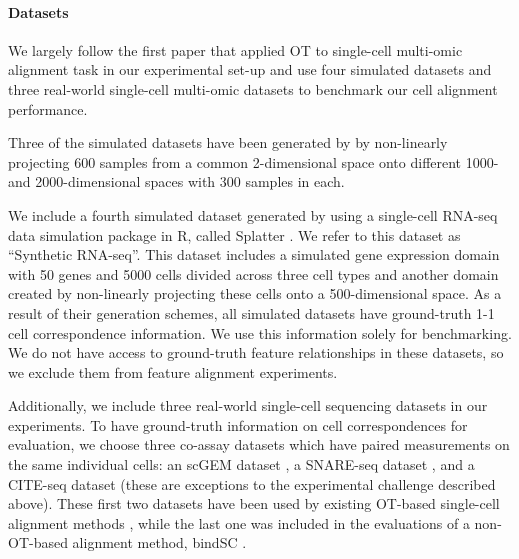 \paragraph{Datasets} We largely follow the first paper that applied OT to
single-cell multi-omic alignment task \citep{Demetci20} in our experimental set-up and
use four simulated datasets and three real-world single-cell multi-omic datasets to benchmark
our cell alignment performance.

Three of the simulated datasets have been generated by
\citep{liu_et_al:LIPIcs:2019:11040} by non-linearly projecting 600 samples from a common
2-dimensional space onto different 1000- and 2000-dimensional spaces with 300 samples in each.

We include a fourth simulated dataset generated by \citep{Demetci20} using a single-cell RNA-seq
data simulation package in R, called Splatter \citep{zappia2017splatter}.
We refer to this dataset as ``Synthetic RNA-seq''. This dataset includes a simulated gene expression
domain with 50 genes and 5000 cells divided across three cell types and another domain created
by non-linearly projecting these cells onto a 500-dimensional space. As a result of
their generation schemes, all simulated datasets have ground-truth 1-1 cell
correspondence information. We use this information solely for benchmarking.
We do not have access to ground-truth feature relationships in these datasets,
so we exclude them from feature alignment experiments.

Additionally, we include three real-world single-cell sequencing datasets in our experiments.
To have ground-truth information on cell correspondences for evaluation, we choose
three co-assay datasets which have paired measurements on the same individual cells:
an scGEM dataset \citep{cheow2016}, a SNARE-seq dataset \citep{SNAREseq}, and
a CITE-seq dataset \citep{CITEseq} (these are exceptions to the experimental challenge
described above). These first two datasets have been used by existing
OT-based single-cell alignment methods
\citep{cao2020unsupervised, singh20, Demetci20, Pamona, Demetci22},
while the last one was included in the evaluations of a non-OT-based alignment method,
bindSC \citep{bindSC}.

